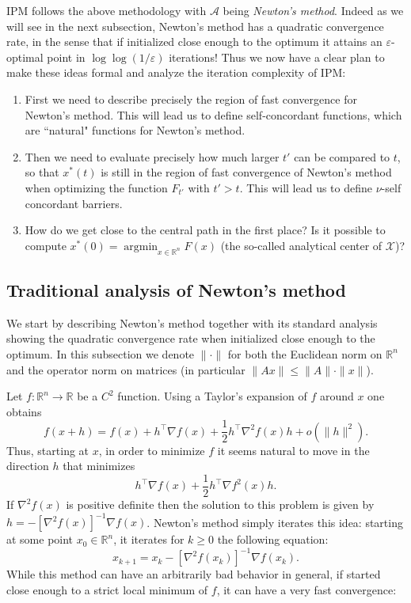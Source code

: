 \documentclass[openany]{now}
\newcommand{\R}{\mathbb{R}}
\newcommand{\cA}{\mathcal{A}}
\renewcommand{\epsilon}{\varepsilon}
\newcommand{\argmin}{\mathop{\mathrm{argmin}}}
\begin{document}
IPM follows the above methodology with $\cA$ being {\em Newton's method}. Indeed as we will see in the next subsection, Newton's method has a quadratic convergence rate, in the sense that if initialized close enough to the optimum it attains an $\epsilon$-optimal point in $\log\log(1/\epsilon)$ iterations! Thus we now have a clear plan to make these ideas formal and analyze the iteration complexity of IPM:
\begin{enumerate}
\item First we need to describe precisely the region of fast convergence for Newton's method. This will lead us to define self-concordant functions, which are ``natural" functions for Newton's method.
\item Then we need to evaluate precisely how much larger $t'$ can be compared to $t$, so that $x^*(t)$ is still in the region of fast convergence of Newton's method when optimizing the function $F_{t'}$ with $t'>t$. This will lead us to define $\nu$-self concordant barriers.
\item How do we get close to the central path in the first place? Is it possible to compute $x^*(0) = \argmin_{x \in \R^n} F(x)$ (the so-called analytical center of $\mathcal{X}$)?
\end{enumerate}

\subsection{Traditional analysis of Newton's method} \label{sec:tradanalysisNM}
We start by describing Newton's method together with its standard analysis showing the quadratic convergence rate when initialized close enough to the optimum. In this subsection we denote $\|\cdot\|$ for both the Euclidean norm on $\R^n$ and the operator norm on matrices (in particular $\|A x\| \leq \|A\| \cdot \|x\|$).

Let $f: \R^n \rightarrow \R$ be a $C^2$ function. 
Using a Taylor's expansion of $f$ around $x$ one obtains
$$f(x+h) = f(x) + h^{\top} \nabla f(x) + \frac12 h^{\top} \nabla^2 f(x) h + o(\|h\|^2) .$$
Thus, starting at $x$, in order to minimize $f$ it seems natural to move in the direction $h$ that minimizes 
$$h^{\top} \nabla f(x) + \frac12 h^{\top} \nabla f^2(x) h .$$
If $\nabla^2 f(x)$ is positive definite then the solution to this problem is given by $h = - [\nabla^2 f(x)]^{-1} \nabla f(x)$. Newton's method simply iterates this idea: starting at some point $x_0 \in \R^n$, it iterates for $k \geq 0$ the following equation:
$$x_{k+1} = x_k  - [\nabla^2 f(x_k)]^{-1} \nabla f(x_k) .$$
While this method can have an arbitrarily bad behavior in general, if started close enough to a strict local minimum of $f$, it can have a very fast convergence:
\end{document}

